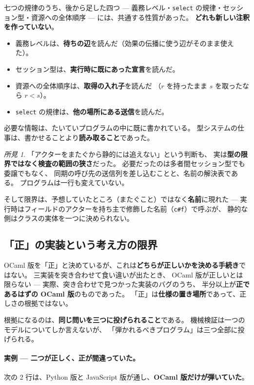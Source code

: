 \documentclass[11pt,a4paper]{ltjsarticle}
\theoremstyle{definition}
\theoremstyle{remark}
\newtheorem{finding}[theorem]{所見}
\begin{document}
七つの規律のうち、後から足した四つ ---
義務レベル・\texttt{select} の規律・セッション型・資源への全体順序 ---
には、共通する性質があった。
\textbf{どれも新しい注釈を作っていない}。

\begin{itemize}
\item 義務レベルは、\textbf{待ちの辺}を読んだ（効果の伝播に使う辺がそのまま使えた）。
\item セッション型は、\textbf{実行時に既にあった宣言}を読んだ。
\item 資源への全体順序は、\textbf{取得の入れ子}を読んだ
      （$r$ を持ったまま $s$ を取ったなら $r < s$）。
\item \texttt{select} の規律は、\textbf{他の場所にある送信}を読んだ。
\end{itemize}

必要な情報は、たいていプログラムの中に既に書かれている。
型システムの仕事は、書かせることより\textbf{読み取ること}であった。

\begin{finding}
「アクターをまたぐから静的には追えない」という判断も、
実は\textbf{型の限界ではなく検査の範囲の狭さ}だった。
必要だったのは多者間セッション型でも委譲でもなく、
同期の呼び先の送信列を差し込むことと、名前の解決表である。
プログラムは一行も変えていない。

そして限界は、予想していたところ（またぐこと）ではなく\textbf{名前}に現れた ---
実行時はフィールドのアクターを持ち主で修飾した名前（\texttt{c\#f}）で呼ぶが、
静的な側はクラスの実体を一つに決められない。
\end{finding}

\subsection{「正」の実装という考え方の限界}

OCaml 版を「正」と決めているが、これは\textbf{どちらが正しいかを決める手続き}ではない。
三実装を突き合わせて食い違いが出たとき、
OCaml 版が正しいとは限らない ---
実際、突き合わせで見つかった実装のバグのうち、
半分以上が\textbf{正であるはずの OCaml 版}のものであった。
「正」は\textbf{仕様の置き場所}であって、正しさの根拠ではない。

根拠になるのは、\textbf{同じ問いを三つに投げられること}である。
機械検証は一つのモデルについてしか言えないが、
「弾かれるべきプログラム」は三つ全部に投げられる。

\paragraph{実例 --- 二つが正しく、正が間違っていた。}
次の 2 行は、Python 版と JavaScript 版が通し、\textbf{OCaml 版だけが弾いていた}。
\end{document}
